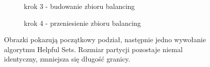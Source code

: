 \begin{figure}[h]
\begin{subfigure}{.5\textwidth}
    \centering
    \caption[short]{krok 3 - budowanie zbioru balancing}
\end{subfigure}
\begin{subfigure}{.5\textwidth}
    \centering
    \caption[short]{krok 4 - przeniesienie zbioru balancing}
\end{subfigure}%
\caption{Obrazki pokazują początkowy podział, następnie jedno wywołanie algorytmu Helpful Sets. Rozmiar partycji pozostaje
niemal identyczny, zmniejsza się długość granicy.}
\label{im:balancing}
\end{figure}

